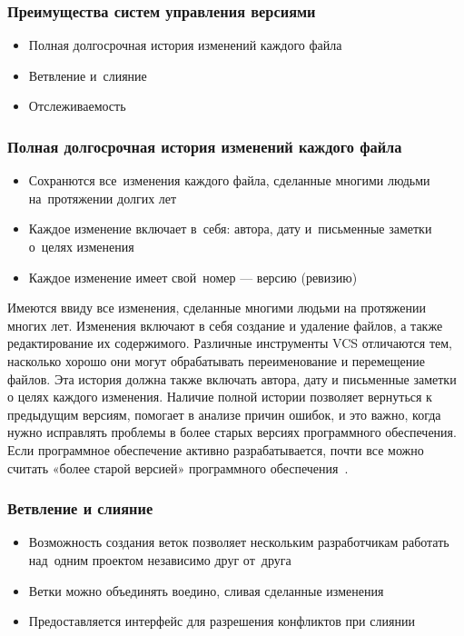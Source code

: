 \documentclass{../industrial-development}
\begin{document}
\begin{frame} \frametitle{Преимущества систем управления версиями}

  \begin{itemize}
  \item Полная долгосрочная история изменений каждого файла
  \item Ветвление и~слияние
  \item Отслеживаемость
  \end{itemize}
\end{frame}

\begin{frame} \frametitle{Полная долгосрочная история изменений каждого файла}

  \begin{itemize}
  \item Сохранются все~изменения каждого файла, сделанные многими людьми на~протяжении долгих лет
  \item Каждое изменение включает в~себя: автора, дату и~письменные заметки о~целях изменения
  \item Каждое изменение имеет свой~номер --- версию (ревизию)
  \end{itemize}
\end{frame}

\lecturenotes

Имеются ввиду все изменения, сделанные многими людьми на протяжении многих лет. Изменения включают в себя создание и удаление файлов, а также редактирование их содержимого. Различные инструменты VCS отличаются тем, насколько хорошо они могут обрабатывать переименование и перемещение файлов. Эта история должна также включать автора, дату и письменные заметки о целях каждого изменения. Наличие полной истории позволяет вернуться к предыдущим версиям, помогает в анализе причин ошибок, и это важно, когда нужно исправлять проблемы в более старых версиях программного обеспечения. Если программное обеспечение активно разрабатывается, почти все можно считать «более старой версией» программного обеспечения~\cite{Atlassian}.

\begin{frame} \frametitle{Ветвление и слияние}
  
  \begin{itemize}
  \item Возможность создания веток позволяет нескольким разработчикам работать над~одним проектом независимо друг от~друга
  \item Ветки можно объединять воедино, сливая сделанные изменения
  \item Предоставляется интерфейс для разрешения конфликтов при слиянии
  \end{itemize}
\end{frame}
\end{document}
